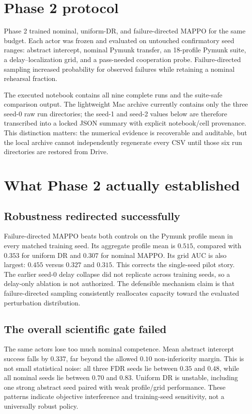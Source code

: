 \documentclass[12pt,twocolumn]{article}
\begin{document}
\section{Phase 2 protocol}
Phase 2 trained nominal, uniform-DR, and failure-directed MAPPO for the same budget. Each actor was
frozen and evaluated on untouched confirmatory seed ranges: abstract intercept, nominal Pymunk
transfer, an 18-profile Pymunk suite, a delay--localization grid, and a pass-needed cooperation
probe. Failure-directed sampling increased probability for observed failures while retaining a
nominal rehearsal fraction.

The executed notebook contains all nine complete runs and the suite-safe comparison output.
The lightweight Mac archive currently contains only the three seed-0 raw run directories; the
seed-1 and seed-2 values below are therefore transcribed into a locked JSON summary with explicit
notebook/cell provenance. This distinction matters: the numerical evidence is recoverable and
auditable, but the local archive cannot independently regenerate every CSV until those six run
directories are restored from Drive.

  {}
  {}

\section{What Phase 2 actually established}
\subsection{Robustness redirected successfully}
Failure-directed MAPPO beats both controls on the Pymunk profile mean in every matched training
seed. Its aggregate profile mean is $0.515$, compared with $0.353$ for uniform DR and $0.307$ for
nominal MAPPO. Its grid AUC is also largest: $0.455$ versus $0.327$ and $0.315$. This corrects the
single-seed pilot story. The earlier seed-0 delay collapse did not replicate across training
seeds, so a delay-only ablation is not authorized. The defensible mechanism claim is that
failure-directed sampling consistently reallocates capacity toward the evaluated perturbation
distribution.

\subsection{The overall scientific gate failed}
The same actors lose too much nominal competence. Mean abstract intercept success falls by
$0.337$, far beyond the allowed $0.10$ non-inferiority margin. This is not small statistical
noise: all three FDR seeds lie between $0.35$ and $0.48$, while all nominal seeds lie between
$0.70$ and $0.83$. Uniform DR is unstable, including one strong abstract seed paired with weak
profile/grid performance. These patterns indicate objective interference and training-seed
sensitivity, not a universally robust policy.
\end{document}

